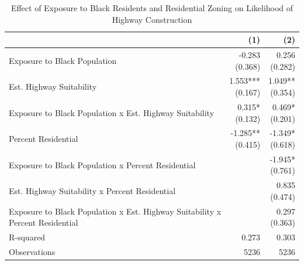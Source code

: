 \begin{table}[h]
\centering
\caption{Effect of Exposure to Black Residents and Residential Zoning on Likelihood of Highway Construction}
\label{tab:results/suitabilityxblackshare+xpctres}
\begin{threeparttable}
\begin{tabular*}{1.0\textwidth}{@{\extracolsep{\fill}}l*{2}{r}}
\toprule
 & (1) & (2) \\
\midrule
Exposure to Black Population & \makecell[tr]{-0.283 \\ (0.368)} & \makecell[tr]{0.256 \\ (0.282)} \\
Est. Highway Suitability & \makecell[tr]{1.553{***} \\ (0.167)} & \makecell[tr]{1.049{**} \\ (0.354)} \\
Exposure to Black Population x Est. Highway Suitability & \makecell[tr]{0.315{*} \\ (0.132)} & \makecell[tr]{0.469{*} \\ (0.201)} \\
Percent Residential & \makecell[tr]{-1.285{**} \\ (0.415)} & \makecell[tr]{-1.349{*} \\ (0.618)} \\
Exposure to Black Population x Percent Residential &  & \makecell[tr]{-1.945{*} \\ (0.761)} \\
Est. Highway Suitability x Percent Residential &  & \makecell[tr]{0.835 \\ (0.474)} \\
Exposure to Black Population x Est. Highway Suitability x Percent Residential &  & \makecell[tr]{0.297 \\ (0.363)} \\
R-squared & 0.273 & 0.303 \\
Observations & 5236 & 5236 \\
\bottomrule
\end{tabular*}
\begin{tablenotes}[flushleft]
\footnotesize

\end{tablenotes}
\end{threeparttable}
\end{table}
